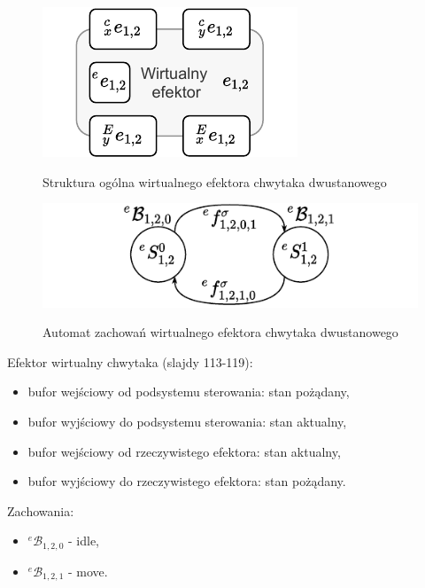 \begin{figure}
    \centering
    \includegraphics[width=0.75\columnwidth]{figures/ISR-ve-gripper-model.pdf}
    \label{fig:model-vr-camera}
    \caption{Struktura ogólna wirtualnego efektora chwytaka dwustanowego}
\end{figure}

\begin{figure}
    \centering
    \includegraphics[width=\columnwidth]{figures/ISR-ve-gripper-behaviours.pdf}
    \label{fig:zachowania-ve-gripper}
    \caption{Automat zachowań wirtualnego efektora chwytaka dwustanowego}
\end{figure}

Efektor wirtualny chwytaka (slajdy 113-119):
\begin{itemize}
    \item bufor wejściowy od podsystemu sterowania: stan pożądany,
    \item bufor wyjściowy do podsystemu sterowania: stan aktualny,
    \item bufor wejściowy od rzeczywistego efektora: stan aktualny,
    \item bufor wyjściowy do rzeczywistego efektora: stan pożądany.
\end{itemize}


Zachowania:
\begin{itemize}
    \item ${}^{e}\mathcal{B}_{1,2,0}$ - idle,
    \item ${}^{e}\mathcal{B}_{1,2,1}$ - move.
\end{itemize}